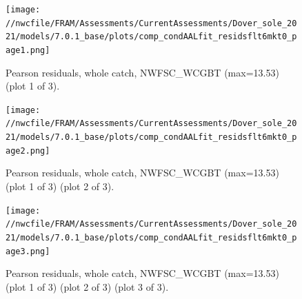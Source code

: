 \documentclass[11pt,
  english,
  a4paper,
]{article}
\begin{document}
\tagmcend\tagstructend


\begin{figure}
\centering
\texttt{[image: //nwcfile/FRAM/Assessments/CurrentAssessments/Dover\_sole\_2021/models/7.0.1\_base/plots/comp\_condAALfit\_residsflt6mkt0\_page1.png]}
\caption{Pearson residuals, whole catch, NWFSC\_WCGBT (max=13.53) (plot 1 of 3).\label{fig:comp_condAALfit_residsflt6mkt0_page1}}
\end{figure}

\tagmcend\tagstructend


\begin{figure}
\centering
\texttt{[image: //nwcfile/FRAM/Assessments/CurrentAssessments/Dover\_sole\_2021/models/7.0.1\_base/plots/comp\_condAALfit\_residsflt6mkt0\_page2.png]}
\caption{Pearson residuals, whole catch, NWFSC\_WCGBT (max=13.53) (plot 1 of 3) (plot 2 of 3).\label{fig:comp_condAALfit_residsflt6mkt0_page2}}
\end{figure}

\tagmcend\tagstructend


\begin{figure}
\centering
\texttt{[image: //nwcfile/FRAM/Assessments/CurrentAssessments/Dover\_sole\_2021/models/7.0.1\_base/plots/comp\_condAALfit\_residsflt6mkt0\_page3.png]}
\caption{Pearson residuals, whole catch, NWFSC\_WCGBT (max=13.53) (plot 1 of 3) (plot 2 of 3) (plot 3 of 3).\label{fig:comp_condAALfit_residsflt6mkt0_page3}}
\end{figure}

\tagmcend\tagstructend
\end{document}
